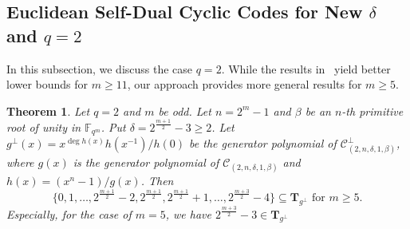 \documentclass[10pt,a4paper]{amsart}
\newtheorem{theorem}{Theorem}
\begin{document}
\subsection{Euclidean Self-Dual Cyclic Codes for New $\delta$ and $q=2$}

In this subsection, we discuss the case $q = 2$. While the results in~\cite{wang2026constructionsselfdualbinarycyclic} yield better lower bounds for $m \ge 11$, our approach provides more general results for $m \ge 5$.
\begin{theorem}
    \label{2 small delta}
    Let $q=2$ and $m$ be odd. Let $n=2^m-1$ and $\beta$ be an $n$-th primitive root of unity in $\mathbb{F}_{q^m}$. Put $\delta=2^{\frac{m+1}{2}}-3\ge2$. Let $g^\perp(x)=x^{\deg h(x)}h(x^{-1})/h(0)$ be the generator polynomial of $\mathcal{C}_{(2,n,\delta,1,\beta)}^\perp$, where $g(x)$ is the generator polynomial of $\mathcal{C}_{(2,n,\delta,1,\beta)}$ and $h(x)=(x^n-1)/g(x)$. Then \[\{0,1,\dots,2^\frac{m+1}{2}-2,2^\frac{m+1}{2},2^\frac{m+1}{2}+1,\dots,2^\frac{m+3}{2}-4\}\subseteq \textbf{T}_{g^\perp} \text{~for~} m\ge 5.\]
    Especially, for the case of $m=5$, we have $2^\frac{m+3}{2}-3\in \textbf{T}_{g^\perp}$
\end{theorem}
\end{document}
